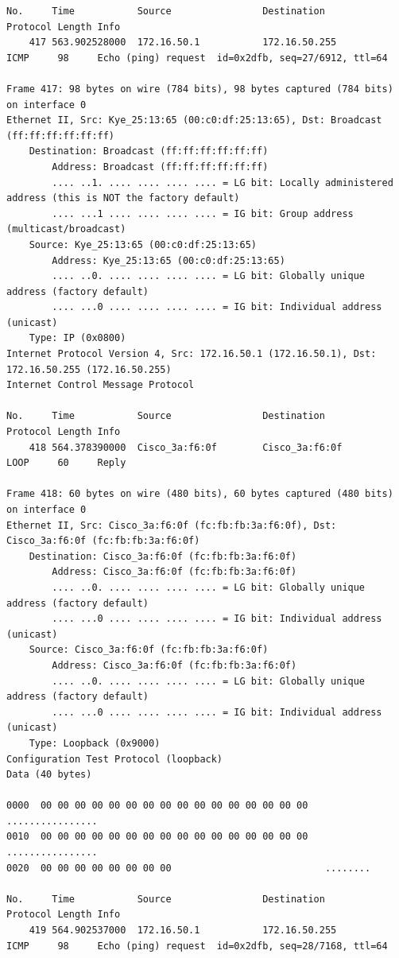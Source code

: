 \documentclass[a4paper,11pt]{article}
\begin{document}
\begin{lstlisting}
No.     Time           Source                Destination           Protocol Length Info
    417 563.902528000  172.16.50.1           172.16.50.255         ICMP     98     Echo (ping) request  id=0x2dfb, seq=27/6912, ttl=64

Frame 417: 98 bytes on wire (784 bits), 98 bytes captured (784 bits) on interface 0
Ethernet II, Src: Kye_25:13:65 (00:c0:df:25:13:65), Dst: Broadcast (ff:ff:ff:ff:ff:ff)
    Destination: Broadcast (ff:ff:ff:ff:ff:ff)
        Address: Broadcast (ff:ff:ff:ff:ff:ff)
        .... ..1. .... .... .... .... = LG bit: Locally administered address (this is NOT the factory default)
        .... ...1 .... .... .... .... = IG bit: Group address (multicast/broadcast)
    Source: Kye_25:13:65 (00:c0:df:25:13:65)
        Address: Kye_25:13:65 (00:c0:df:25:13:65)
        .... ..0. .... .... .... .... = LG bit: Globally unique address (factory default)
        .... ...0 .... .... .... .... = IG bit: Individual address (unicast)
    Type: IP (0x0800)
Internet Protocol Version 4, Src: 172.16.50.1 (172.16.50.1), Dst: 172.16.50.255 (172.16.50.255)
Internet Control Message Protocol

No.     Time           Source                Destination           Protocol Length Info
    418 564.378390000  Cisco_3a:f6:0f        Cisco_3a:f6:0f        LOOP     60     Reply

Frame 418: 60 bytes on wire (480 bits), 60 bytes captured (480 bits) on interface 0
Ethernet II, Src: Cisco_3a:f6:0f (fc:fb:fb:3a:f6:0f), Dst: Cisco_3a:f6:0f (fc:fb:fb:3a:f6:0f)
    Destination: Cisco_3a:f6:0f (fc:fb:fb:3a:f6:0f)
        Address: Cisco_3a:f6:0f (fc:fb:fb:3a:f6:0f)
        .... ..0. .... .... .... .... = LG bit: Globally unique address (factory default)
        .... ...0 .... .... .... .... = IG bit: Individual address (unicast)
    Source: Cisco_3a:f6:0f (fc:fb:fb:3a:f6:0f)
        Address: Cisco_3a:f6:0f (fc:fb:fb:3a:f6:0f)
        .... ..0. .... .... .... .... = LG bit: Globally unique address (factory default)
        .... ...0 .... .... .... .... = IG bit: Individual address (unicast)
    Type: Loopback (0x9000)
Configuration Test Protocol (loopback)
Data (40 bytes)

0000  00 00 00 00 00 00 00 00 00 00 00 00 00 00 00 00   ................
0010  00 00 00 00 00 00 00 00 00 00 00 00 00 00 00 00   ................
0020  00 00 00 00 00 00 00 00                           ........

No.     Time           Source                Destination           Protocol Length Info
    419 564.902537000  172.16.50.1           172.16.50.255         ICMP     98     Echo (ping) request  id=0x2dfb, seq=28/7168, ttl=64


\end{lstlisting}
\end{document}
